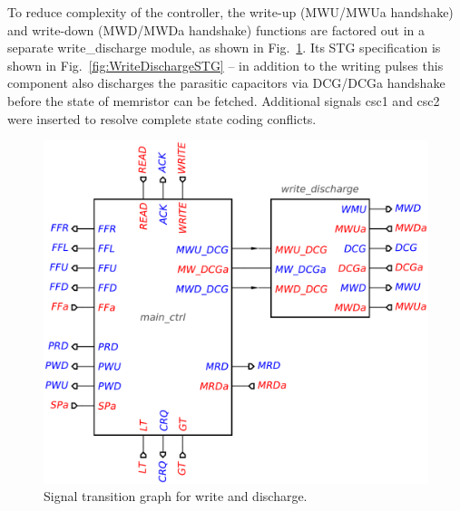 \documentclass[twocolumn,conference]{IEEEtran}
\begin{document}
To reduce complexity of the controller, the write-up (MWU/MWUa handshake) and write-down (MWD/MWDa handshake) functions are factored out in a separate \textsf{write\_discharge} module, as shown in Fig.~\ref{fig:ControllerTopCircuit}. Its STG specification is shown in Fig.~\ref{fig:WriteDischargeSTG} -- in addition to the writing pulses this component also discharges the parasitic capacitors via DCG/DCGa handshake before the state of memristor can be fetched. Additional signals csc1 and csc2 were inserted to resolve complete state coding conflicts.

\begin{figure}[h]
    \centering
    \includegraphics[scale=0.3]{figs/control_circuit}
    \caption{Signal transition graph for write and discharge.}
    \label{fig:ControllerTopCircuit}
\end{figure}
\end{document}
